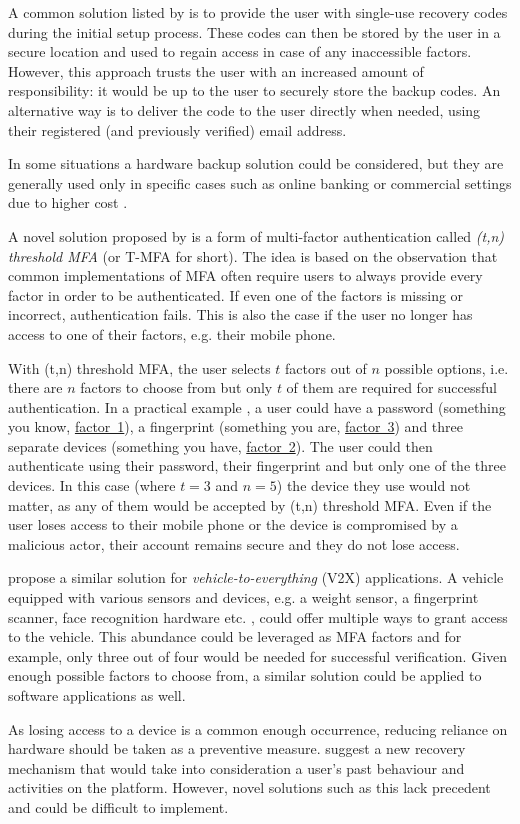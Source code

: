 A common solution listed by \textcite{owasp_multifactor_2024} is to provide the user with single-use recovery codes during the initial setup process. These codes can then be stored by the user in a secure location and used to regain access in case of any inaccessible factors. However, this approach trusts the user with an increased amount of responsibility: it would be up to the user to securely store the backup codes. An alternative way is to deliver the code to the user directly when needed, using their registered (and previously verified) email address.

In some situations a hardware backup solution could be considered, but they are generally used only in specific cases such as online banking or commercial settings due to higher cost \citep[110]{golla_driving_2021}. 

A novel solution proposed by \textcite{li_practical_2021} is a form of multi-factor authentication called \textit{(t,n) threshold MFA} (or T-MFA for short). The idea is based on the observation that common implementations of MFA often require users to always provide every factor in order to be authenticated. If even one of the factors is missing or incorrect, authentication fails. This is also the case if the user no longer has access to one of their factors, e.g. their mobile phone.

With (t,n) threshold MFA, the user selects $t$ factors out of $n$ possible options, i.e. there are $n$ factors to choose from but only $t$ of them are required for successful authentication. In a practical example \citep[Fig.~1]{li_practical_2021}, a user could have a password (something you know, \hyperref[itm:factor1]{factor~1}), a fingerprint (something you are, \hyperref[itm:factor3]{factor~3}) and three separate devices (something you have, \hyperref[itm:factor2]{factor~2}). The user could then authenticate using their password, their fingerprint and but only one of the three devices. In this case (where $t=3$ and $n=5$) the device they use would not matter, as any of them would be accepted by (t,n) threshold MFA. Even if the user loses access to their mobile phone or the device is compromised by a malicious actor, their account remains secure and they do not lose access.

\textcite[15--16]{ometov_multi-factor_2018} propose a similar solution for \textit{vehicle-to-everything} (V2X) applications. A vehicle equipped with various sensors and devices, e.g. a weight sensor, a fingerprint scanner, face recognition hardware etc. \citep[Fig.~4]{ometov_multi-factor_2018}, could offer multiple ways to grant access to the vehicle. This abundance could be leveraged as MFA factors and for example, only three out of four would be needed for successful verification. Given enough possible factors to choose from, a similar solution could be applied to software applications as well.

As losing access to a device is a common enough occurrence, reducing reliance on hardware should be taken as a preventive measure. \textcite[5448]{das_mfa_2020} suggest a new recovery mechanism that would take into consideration a user's past behaviour and activities on the platform. However, novel solutions such as this lack precedent and could be difficult to implement.
